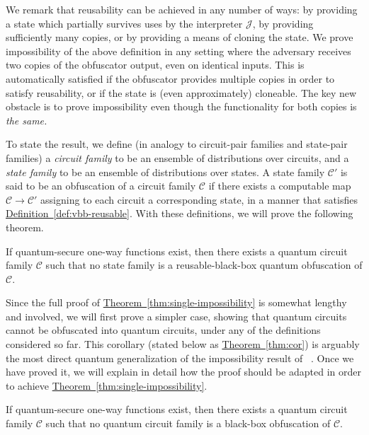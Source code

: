 \documentclass[envcountsame]{llncs}
\numberwithin{equation}{section}
\newcommand{\expref}[2]{\texorpdfstring{\hyperref[#2]{#1~\ref{#2}}}{#1~\ref{#2}}}
\newcommand{\algo}{\mathcal}
\begin{document}
We remark that reusability can be achieved in any number of ways: by providing a state which partially survives uses by the interpreter $\algo J$, by providing sufficiently many copies, or by providing a means of cloning the state. We prove impossibility of the above definition in any setting where the adversary receives two copies of the obfuscator output, even on identical inputs. This is automatically satisfied if the obfuscator provides multiple copies in order to satisfy reusability, or if the state is (even approximately) cloneable. The key new obstacle is to prove impossibility even though the functionality for both copies is \emph{the same.}

To state the result, we define (in analogy to circuit-pair families and state-pair families) a \emph{circuit family} to be an ensemble of distributions over circuits, and a \emph{state family} to be an ensemble of distributions over states. A state family $\mathcal C'$ is said to be an obfuscation of a circuit family $\mathcal C$ if there exists a computable map $\mathcal C \rightarrow \mathcal C'$ assigning to each circuit a corresponding state, in a manner that satisfies \expref{Definition}{def:vbb-reusable}. With these definitions, we will prove the following theorem.

\begin{theorem}\label{thm:single-impossibility}
If quantum-secure one-way functions exist, then there exists a quantum circuit family $\mathcal C$ such that no state family is a reusable-black-box quantum obfuscation of $\mathcal C$.
\end{theorem}

Since the full proof of \expref{Theorem}{thm:single-impossibility} is somewhat lengthy and involved, we will first prove a simpler case, showing that quantum circuits cannot be obfuscated into quantum circuits, under any of the definitions considered so far.  This corollary (stated below as \expref{Theorem}{thm:cor}) is arguably the most direct quantum generalization of the impossibility result of ~\cite{BGIRSVY01}. Once we have proved it, we will explain in detail how the proof should be adapted in order to achieve \expref{Theorem}{thm:single-impossibility}.

\begin{theorem}\label{thm:cor}
If quantum-secure one-way functions exist, then there exists a quantum circuit family $\mathcal C$ such that no quantum circuit family is a black-box obfuscation of $\mathcal C$.
\end{theorem}
\end{document}
